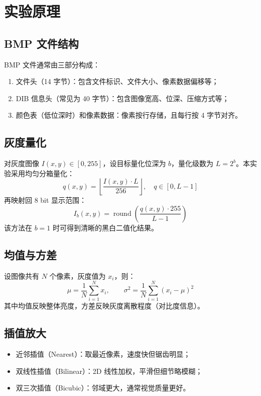 \documentclass[UTF8,a4paper,12pt]{ctexart}
\begin{document}
\section{实验原理}
\subsection{BMP 文件结构}
BMP 文件通常由三部分构成：
\begin{enumerate}
  \item 文件头（14 字节）：包含文件标识、文件大小、像素数据偏移等；
  \item DIB 信息头（常见为 40 字节）：包含图像宽高、位深、压缩方式等；
  \item 颜色表（低位深时）和像素数据：像素按行存储，且每行按 4 字节对齐。
\end{enumerate}

\subsection{灰度量化}
对灰度图像 $I(x,y)\in[0,255]$，设目标量化位深为 $b$，量化级数为 $L=2^b$。本实验采用均匀分箱量化：
\begin{equation}
q(x,y)=\left\lfloor \frac{I(x,y)\cdot L}{256}\right\rfloor,\quad q\in[0,L-1]
\end{equation}
再映射回 8 bit 显示范围：
\begin{equation}
I_b(x,y)=\operatorname{round}\left(\frac{q(x,y)\cdot255}{L-1}\right)
\end{equation}
该方法在 $b=1$ 时可得到清晰的黑白二值化结果。

\subsection{均值与方差}
设图像共有 $N$ 个像素，灰度值为 $x_i$，则：
\begin{equation}
\mu=\frac{1}{N}\sum_{i=1}^{N}x_i,\qquad
\sigma^2=\frac{1}{N}\sum_{i=1}^{N}(x_i-\mu)^2
\end{equation}
其中均值反映整体亮度，方差反映灰度离散程度（对比度信息）。

\subsection{插值放大}
\begin{itemize}
  \item 近邻插值（Nearest）：取最近像素，速度快但锯齿明显；
  \item 双线性插值（Bilinear）：2D 线性加权，平滑但细节略模糊；
  \item 双三次插值（Bicubic）：邻域更大，通常视觉质量更好。
\end{itemize}
\end{document}
